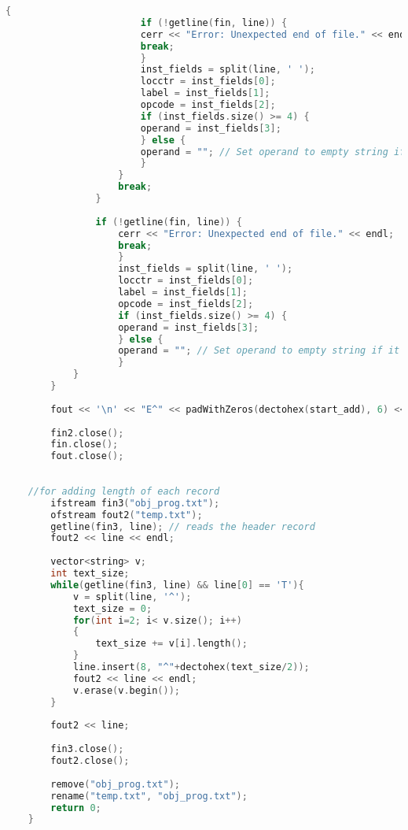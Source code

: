 \documentclass[12pt]{article}
\begin{document}
\begin{lstlisting}[language=C++, caption={Pass 2 - Object Code Generator}]
                    {
                        if (!getline(fin, line)) {
                        cerr << "Error: Unexpected end of file." << endl;
                        break;
                        }
                        inst_fields = split(line, ' ');
                        locctr = inst_fields[0];
                        label = inst_fields[1];
                        opcode = inst_fields[2];
                        if (inst_fields.size() >= 4) {
                        operand = inst_fields[3];
                        } else {
                        operand = ""; // Set operand to empty string if it's not present
                        }
                    }
                    break;
                }
    
                if (!getline(fin, line)) {
                    cerr << "Error: Unexpected end of file." << endl;
                    break;
                    }
                    inst_fields = split(line, ' ');
                    locctr = inst_fields[0];
                    label = inst_fields[1];
                    opcode = inst_fields[2];
                    if (inst_fields.size() >= 4) {
                    operand = inst_fields[3];
                    } else {
                    operand = ""; // Set operand to empty string if it's not present
                    }
            }
        }
    
        fout << '\n' << "E^" << padWithZeros(dectohex(start_add), 6) << endl;
    
        fin2.close();
        fin.close();
        fout.close();
    
    
    //for adding length of each record
        ifstream fin3("obj_prog.txt");
        ofstream fout2("temp.txt");
        getline(fin3, line); // reads the header record
        fout2 << line << endl;
    
        vector<string> v;
        int text_size;
        while(getline(fin3, line) && line[0] == 'T'){
            v = split(line, '^');
            text_size = 0;
            for(int i=2; i< v.size(); i++)
            {
                text_size += v[i].length();
            }
            line.insert(8, "^"+dectohex(text_size/2));
            fout2 << line << endl;
            v.erase(v.begin());
        }
    
        fout2 << line;
    
        fin3.close();
        fout2.close();
    
        remove("obj_prog.txt");
        rename("temp.txt", "obj_prog.txt");
        return 0;
    }
\end{lstlisting}
\end{document}

